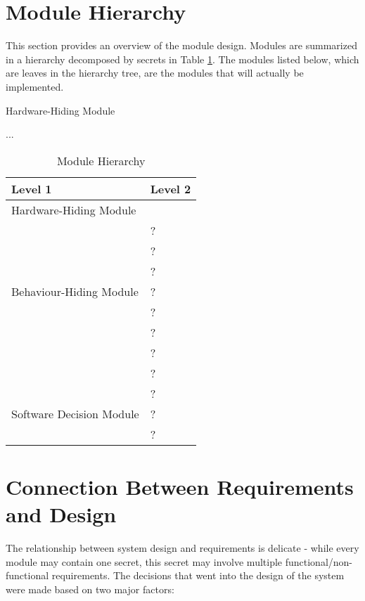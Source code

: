 \documentclass[12pt, titlepage]{article}
\newcommand{\newSection}[1]{
  \newpage
  \section{#1}
}
\newcounter{mnum}
\newcommand{\mthemnum}{M\themnum}
\begin{document}
\newSection{Module Hierarchy} \label{SecMH}

	This section provides an overview of the module design. Modules are summarized in a hierarchy decomposed by secrets in Table \ref{TblMH}. The modules listed below, which are leaves in the hierarchy tree, are the modules that will actually be implemented.

	\bigskip\begin{description}
	\item [ \mthemnum \label{mHH}:] Hardware-Hiding Module
	\item ...
	\end{description}


	\begin{table}[h!]
		\centering
		\begin{tabular}{p{} p{}}
			\toprule
			\textbf{Level 1} & \textbf{Level 2}\\
			\midrule

			{Hardware-Hiding Module} & ~ \\
			\midrule

			\multirow{7}{0.3\textwidth}{Behaviour-Hiding Module} & ?\\
			& ?\\
			& ?\\
			& ?\\
			& ?\\
			& ?\\
			& ?\\ 
			& ?\\
			\midrule

			\multirow{3}{0.3\textwidth}{Software Decision Module} & {?}\\
			& ?\\
			& ?\\
			\bottomrule

		\end{tabular}
		\caption{Module Hierarchy}
		\label{TblMH}
	\end{table}

\newSection{Connection Between Requirements and Design} \label{SecConnection}

	
	The relationship between system design and requirements is delicate - while every module may contain one secret, this secret may involve multiple functional/non-functional requirements. The decisions that went into the design of the system were made based on two major factors:
\end{document}
